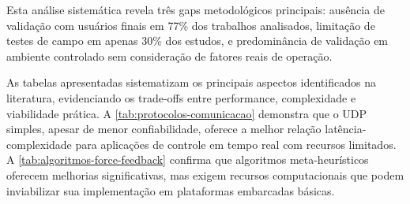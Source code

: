 \begin{table}[!ht]
\captionsetup{width=16cm}
\end{table}

Esta análise sistemática revela três gaps metodológicos principais: ausência de validação com usuários finais em 77\% dos trabalhos analisados, limitação de testes de campo em apenas 30\% dos estudos, e predominância de validação em ambiente controlado sem consideração de fatores reais de operação.

As tabelas apresentadas sistematizam os principais aspectos identificados na literatura, evidenciando os trade-offs entre performance, complexidade e viabilidade prática. A \autoref{tab:protocolos-comunicacao} demonstra que o UDP simples, apesar de menor confiabilidade, oferece a melhor relação latência-complexidade para aplicações de controle em tempo real com recursos limitados. A \autoref{tab:algoritmos-force-feedback} confirma que algoritmos meta-heurísticos oferecem melhorias significativas, mas exigem recursos computacionais que podem inviabilizar sua implementação em plataformas embarcadas básicas.

